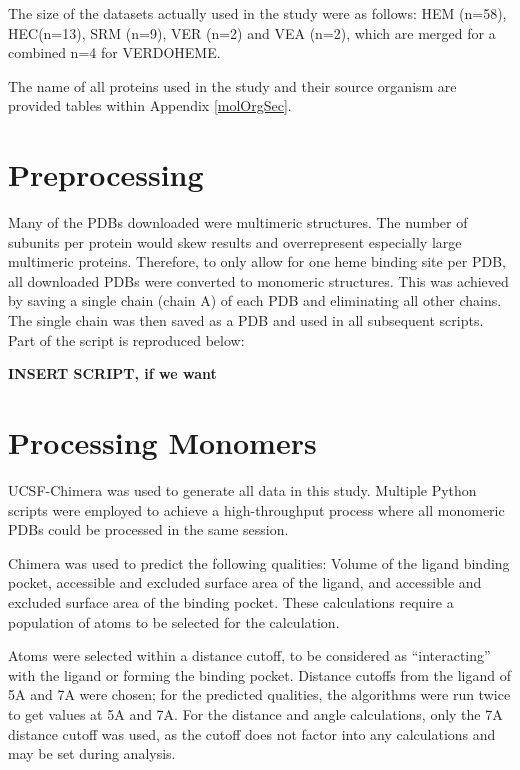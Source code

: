 \documentclass[a4paper, nobind]{templates/ociamthesis}
\begin{document}
The size of the datasets actually used in the study were as follows: HEM (n=58), HEC(n=13), SRM (n=9), VER (n=2) and VEA (n=2), which are merged for a combined n=4 for VERDOHEME.

The name of all proteins used in the study and their source organism are provided tables within Appendix \ref{molOrgSec}.

\hypertarget{preprocessing}{%
\section{Preprocessing}\label{preprocessing}}

Many of the PDBs downloaded were multimeric structures. The number of subunits per protein would skew results and overrepresent especially large multimeric proteins. Therefore, to only allow for one heme binding site per PDB, all downloaded PDBs were converted to monomeric structures. This was achieved by saving a single chain (chain A) of each PDB and eliminating all other chains. The single chain was then saved as a PDB and used in all subsequent scripts. Part of the script is reproduced below:

\textbf{INSERT SCRIPT, if we want}

\hypertarget{processing-monomers}{%
\section{Processing Monomers}\label{processing-monomers}}

UCSF-Chimera was used to generate all data in this study. Multiple Python scripts were employed to achieve a high-throughput process where all monomeric PDBs could be processed in the same session.

Chimera was used to predict the following qualities: Volume of the ligand binding pocket, accessible and excluded surface area of the ligand, and accessible and excluded surface area of the binding pocket. These calculations require a population of atoms to be selected for the calculation.

Atoms were selected within a distance cutoff, to be considered as ``interacting'' with the ligand or forming the binding pocket. Distance cutoffs from the ligand of 5A and 7A were chosen; for the predicted qualities, the algorithms were run twice to get values at 5A and 7A. For the distance and angle calculations, only the 7A distance cutoff was used, as the cutoff does not factor into any calculations and may be set during analysis.
\end{document}
